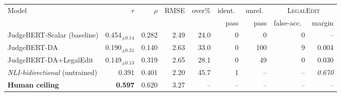 \setlength{\tabcolsep}{4.5pt}
\begin{tabular}{lrrrrrrrr}
\toprule
Model & $r$ & $\rho$ & RMSE & over\% & ident.\ & unrel.\ & \multicolumn{2}{c}{\textsc{LegalEdit}} \\
\cmidrule(lr){8-9}
 &  &  &  &  & pass & pass & false-acc.\ & margin \\
\midrule
JudgeBERT-Scalar (baseline) & 0.454$_{\pm0.14}$ & 0.282 & 2.49 & 24.0 & 0 & 0 & 0 & -- \\
\midrule
JudgeBERT-DA & 0.190$_{\pm0.21}$ & 0.140 & 2.63 & 33.0 & 0 & 100 & 9 & 0.004 \\
JudgeBERT-DA+LegalEdit & 0.149$_{\pm0.13}$ & 0.319 & 2.65 & 28.1 & 0 & 49 & 0 & 0.030 \\
\midrule
\emph{NLI-bidirectional} (untrained) & 0.391 & 0.401 & 2.20 & 45.7 & 1 & -- & -- & \emph{0.670} \\
\textbf{Human ceiling} & \textbf{0.597} & 0.620 & 3.27 & -- & -- & -- & -- & -- \\
\bottomrule
\end{tabular}